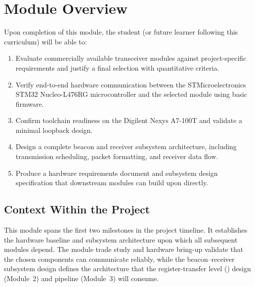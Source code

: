 \documentclass[11pt,letterpaper]{article}
\begin{document}
	\tableofcontents
	\newpage
	
	\section{Module Overview}
	
	\begin{tcolorbox}[objective={Module 1 Learning Objectives}]
		Upon completion of this module, the student (or future learner following this curriculum) will be able to:
		\begin{enumerate}[label=\textbf{LO-\arabic*}]
			\item Evaluate commercially available \RF{} transceiver modules against project-specific requirements and justify a final selection with quantitative criteria.
			\item Verify end-to-end hardware communication between the STMicroelectronics STM32 Nucleo-L476RG microcontroller and the selected \RF{} module using basic firmware.
			\item Confirm \FPGA{} toolchain readiness on the Digilent Nexys A7-100T and validate a minimal loopback design.
			\item Design a complete \RF{} beacon and receiver subsystem architecture, including transmission scheduling, packet formatting, and receiver data flow.
			\item Produce a hardware requirements document and subsystem design specification that downstream modules can build upon directly.
		\end{enumerate}
	\end{tcolorbox}
	
	\subsection{Context Within the Project}
	
	This module spans the first two milestones in the project timeline. It establishes the hardware baseline and subsystem architecture upon which all subsequent modules depend. The \RF{} module trade study and hardware bring-up validate that the chosen components can communicate reliably, while the beacon--receiver subsystem design defines the architecture that the \FPGA{} register-transfer level (\RTL{}) design (Module~2) and \ML{} pipeline (Module~3) will consume.
	
\end{document}
